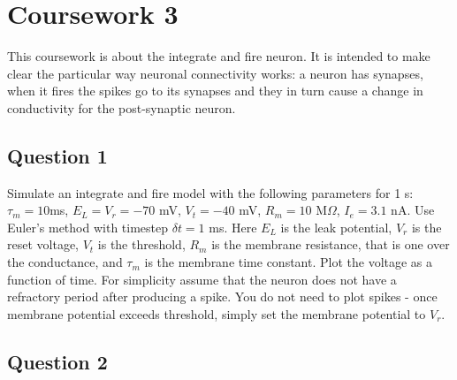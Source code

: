 \documentclass[12pt]{article}
\begin{document}
\section*{Coursework 3}

This coursework is about the integrate and fire neuron. It is intended
to make clear the particular way neuronal connectivity works: a neuron
has synapses, when it fires the spikes go to its synapses and they in
turn cause a change in conductivity for the post-synaptic neuron.

\subsection*{Question 1}

Simulate an integrate and fire model with the following parameters for
1 s: $\tau_m = 10 $ms, $E_L = V_r = -70$ mV, $V_t = -40$ mV, $R_m= 10$
M$\Omega$, $I_e = 3.1 $ nA. Use Euler's method with timestep $\delta t
= 1$ ms. Here $E_L$ is the leak potential, $V_r$ is the reset voltage,
$V_t$ is the threshold, $R_m$ is the membrane resistance, that is one
over the conductance, and $\tau_m$ is the membrane time constant. Plot
the voltage as a function of time. For simplicity assume that the
neuron does not have a refractory period after producing a spike. You
do not need to plot spikes - once membrane potential exceeds
threshold, simply set the membrane potential to $V_r$.

\subsection*{Question 2}
\end{document}
